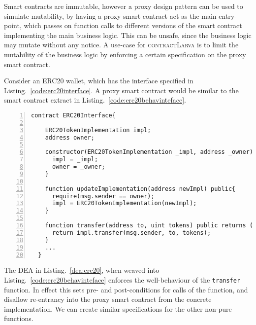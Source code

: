 \documentclass{article}
\newcommand{\contractlarva}{\textsc{contractLarva}\xspace}
\begin{document}
 Smart contracts are immutable, however a proxy design pattern can be used to simulate mutability, by having a proxy smart contract act as the main entry-point, which passes on function calls to different versions of the smart contract implementing the main business logic. This can be unsafe, since the business logic may mutate without any notice. A use-case for \contractlarva is to limit the mutability of the business logic by enforcing a certain specification on the proxy smart contract.
 
 Consider an ERC20 wallet, which has the interface specified in Listing.~\ref{code:erc20interface}. A proxy smart contract would be similar to the smart contract extract in Listing.~\ref{code:erc20behavinteface}.
      
  \small\begin{lstlisting}[language=DEA,basicstyle=\scriptsize,numbers=left,numbersep=2pt,xleftmargin=0.3cm,escapechar=\%,label={code:erc20behavinteface}]
  contract ERC20Interface{
    
    ERC20TokenImplementation impl;
    address owner;
  
    constructor(ERC20TokenImplementation _impl, address _owner) public{
      impl = _impl;
      owner = _owner;
    }
    
    function updateImplementation(address newImpl) public{
      require(msg.sender == owner);
      impl = ERC20TokenImplementation(newImpl);
    }
    
    function transfer(address to, uint tokens) public returns (bool success){
      return impl.transfer(msg.sender, to, tokens);  
    }
    ...
  }
      \end{lstlisting}\normalsize
      
  The DEA in Listing.~\ref{dea:erc20}, when weaved into Listing.~\ref{code:erc20behavinteface} enforces the well-behaviour of the \texttt{transfer} function. In effect this sets pre- and post-conditions for calls of the function, and disallow re-entrancy into the proxy smart contract from the concrete implementation. We can create similar specifications for the other non-pure functions.
  
\end{document}

